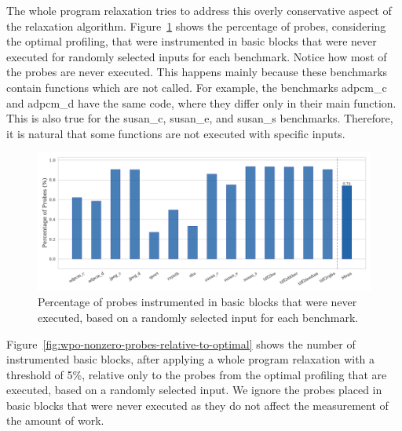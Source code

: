The whole program relaxation tries to address this overly conservative aspect of the relaxation algorithm.
Figure~\ref{fig:null-probes-relative-to-optimal} shows the percentage of probes, considering the optimal profiling, that were instrumented in basic blocks that were never executed for randomly selected inputs for each benchmark.
Notice how most of the probes are never executed.
This happens mainly because these benchmarks contain functions which are not called.
For example, the benchmarks {\flagstype adpcm\_c} and {\flagstype adpcm\_d} have the same code, where they differ only in their {\flagstype main} function.
This is also true for the {\flagstype susan\_c}, {\flagstype susan\_e}, and {\flagstype susan\_s} benchmarks.
Therefore, it is natural that some functions are not executed with specific inputs.

\begin{figure}[ht]
    \centering
    \includegraphics[width=\textwidth]{figs/null-probes-relative-to-optimal.pdf}
    \caption{Percentage of probes instrumented in basic blocks that were never executed, based on a randomly selected input for each benchmark.}
    \label{fig:null-probes-relative-to-optimal}
\end{figure}

\newpage
Figure~\ref{fig:wpo-nonzero-probes-relative-to-optimal} shows the number of instrumented basic blocks, after applying a whole program relaxation with a threshold of 5\%, relative only to the probes from the optimal profiling that are executed, based on a randomly selected input.
We ignore the probes placed in basic blocks that were never executed as they do not affect the measurement of the amount of work.

